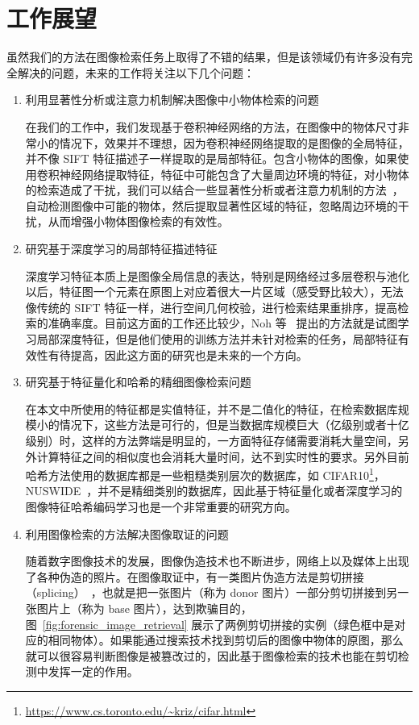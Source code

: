 \section{工作展望}
虽然我们的方法在图像检索任务上取得了不错的结果，但是该领域仍有许多没有完全解决的问题，未来的工作将关注以下几个问题：

\begin{enumerate}
\item 利用显著性分析或注意力机制解决图像中小物体检索的问题

在我们的工作中，我们发现基于卷积神经网络的方法，在图像中的物体尺寸非常小的情况下，效果并不理想，因为卷积神经网络提取的是图像的全局特征，并不像 SIFT 特征描述子一样提取的是局部特征。包含小物体的图像，如果使用卷积神经网络提取特征，特征中可能包含了大量周边环境的特征，对小物体的检索造成了干扰，我们可以结合一些显著性分析或者注意力机制的方法~\cite{Song2017DeepSA}，自动检测图像中可能的物体，然后提取显著性区域的特征，忽略周边环境的干扰，从而增强小物体图像检索的有效性。

\item 研究基于深度学习的局部特征描述特征

深度学习特征本质上是图像全局信息的表达，特别是网络经过多层卷积与池化以后，特征图一个元素在原图上对应着很大一片区域（感受野比较大），无法像传统的 SIFT 特征一样，进行空间几何校验，进行检索结果重排序，提高检索的准确率度。目前这方面的工作还比较少，Noh 等~\cite{Noh2017LargeScaleIR} 提出的方法就是试图学习局部深度特征，但是他们使用的训练方法并未针对检索的任务，局部特征有效性有待提高，因此这方面的研究也是未来的一个方向。

\item 研究基于特征量化和哈希的精细图像检索问题

在本文中所使用的特征都是实值特征，并不是二值化的特征，在检索数据库规模小的情况下，这些方法是可行的，但是当数据库规模巨大（亿级别或者十亿级别）时，这样的方法弊端是明显的，一方面特征存储需要消耗大量空间，另外计算特征之间的相似度也会消耗大量时间，达不到实时性的要求。另外目前哈希方法使用的数据库都是一些粗糙类别层次的数据库，如 CIFAR10\footnote{\url{https://www.cs.toronto.edu/~kriz/cifar.html}}，NUSWIDE~\cite{Chua2009NUSWIDEAR}，并不是精细类别的数据库，因此基于特征量化或者深度学习的图像特征哈希编码学习也是一个非常重要的研究方向。

\item 利用图像检索的方法解决图像取证的问题

随着数字图像技术的发展，图像伪造技术也不断进步，网络上以及媒体上出现了各种伪造的照片。在图像取证中，有一类图片伪造方法是剪切拼接（splicing）~\cite{Farid2009ImageFD}，也就是把一张图片（称为 donor 图片）一部分剪切拼接到另一张图片上（称为 base 图片），达到欺骗目的，图~\ref{fig:forensic_image_retrieval} 展示了两例剪切拼接的实例（绿色框中是对应的相同物体）。如果能通过搜索技术找到剪切后的图像中物体的原图，那么就可以很容易判断图像是被篡改过的，因此基于图像检索的技术也能在剪切检测中发挥一定的作用。
\end{enumerate}







